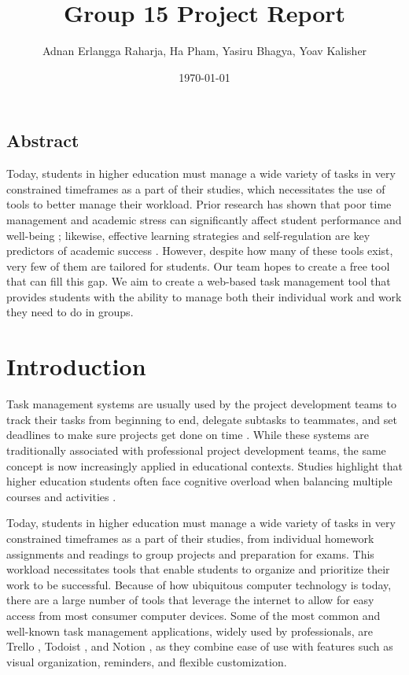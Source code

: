 \documentclass[11pt]{report}
\begin{document}
\title{Group 15 Project Report}
\author{Adnan Erlangga Raharja, Ha Pham, Yasiru Bhagya, Yoav Kalisher}
\date{\today}

\maketitle

\vspace*{3cm}
\section*{Abstract}

Today, students in higher education must manage a wide variety of tasks in very constrained timeframes as a part of their studies, which necessitates the use of tools to better manage their workload. Prior research has shown that poor time management and academic stress can significantly affect student performance and well-being \citep{misra2000college}; likewise, effective learning strategies and self-regulation are key predictors of academic success \citep{zimmerman2002becoming}.
However, despite how many of these tools exist, very few of them are tailored for students. Our team hopes to create a free tool that can fill this gap. We aim to create a web-based task management tool that provides students with the ability to manage both their individual work and work they need to do in groups.


\tableofcontents



\chapter{Introduction}

Task management systems are usually used by the project development teams to track their tasks from beginning to end, delegate subtasks to teammates, and set deadlines to make sure projects get done on time \citep{nurzi2022web}. While these systems are traditionally associated with professional project development teams, the same concept is now increasingly applied in educational contexts. Studies highlight that higher education students often face cognitive overload when balancing multiple courses and activities \citep{kirschner2013learners}. 

Today, students in higher education must manage a wide variety of tasks in very constrained timeframes as a part of their studies, from individual homework assignments and readings to group projects and preparation for exams. This workload necessitates tools that enable students to organize and prioritize their work to be successful. Because of how ubiquitous computer technology is today, there are a large number of tools that leverage the internet to allow for easy access from most consumer computer devices. Some of the most common and well-known task management applications, widely used by professionals, are Trello \citep{shchetynina2022trello}, Todoist \citep{bourbon2021time}, and Notion \citep{reach2022notion}, as they combine ease of use with features such as visual organization, reminders, and flexible customization.
\end{document}
